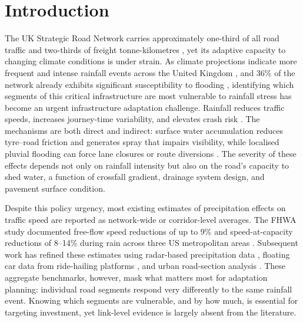 \documentclass[review,authoryear]{elsarticle}
\begin{document}


\section{Introduction}
\label{sec:intro}

The UK Strategic Road Network carries approximately one-third of all road traffic and two-thirds of freight tonne-kilometres \citep{nh2024climate}, yet its adaptive capacity to changing climate conditions is under strain. As climate projections indicate more frequent and intense rainfall events across the United Kingdom \citep{dft2024rea,sias2025roadways}, and 36\% of the network already exhibits significant susceptibility to flooding \citep{orr2024annual}, identifying which segments of this critical infrastructure are most vulnerable to rainfall stress has become an urgent infrastructure adaptation challenge. Rainfall reduces traffic speeds, increases journey-time variability, and elevates crash risk \citep{koetse2009impact,hranac2006empirical}. The mechanisms are both direct and indirect: surface water accumulation reduces tyre--road friction and generates spray that impairs visibility, while localised pluvial flooding can force lane closures or route diversions \citep{pregnolato2017depth}. The severity of these effects depends not only on rainfall intensity but also on the road's capacity to shed water, a function of crossfall gradient, drainage system design, and pavement surface condition.

Despite this policy urgency, most existing estimates of precipitation effects on traffic speed are reported as network-wide or corridor-level averages. The FHWA study documented free-flow speed reductions of up to 9\% and speed-at-capacity reductions of 8--14\% during rain across three US metropolitan areas \citep{hranac2006empirical}. Subsequent work has refined these estimates using radar-based precipitation data \citep{becker2026rainfall}, floating car data from ride-hailing platforms \citep{bi2022weather}, and urban road-section analysis \citep{cai2016rainfall}. These aggregate benchmarks, however, mask what matters most for adaptation planning: individual road segments respond very differently to the same rainfall event. Knowing which segments are vulnerable, and by how much, is essential for targeting investment, yet link-level evidence is largely absent from the literature.
\end{document}
